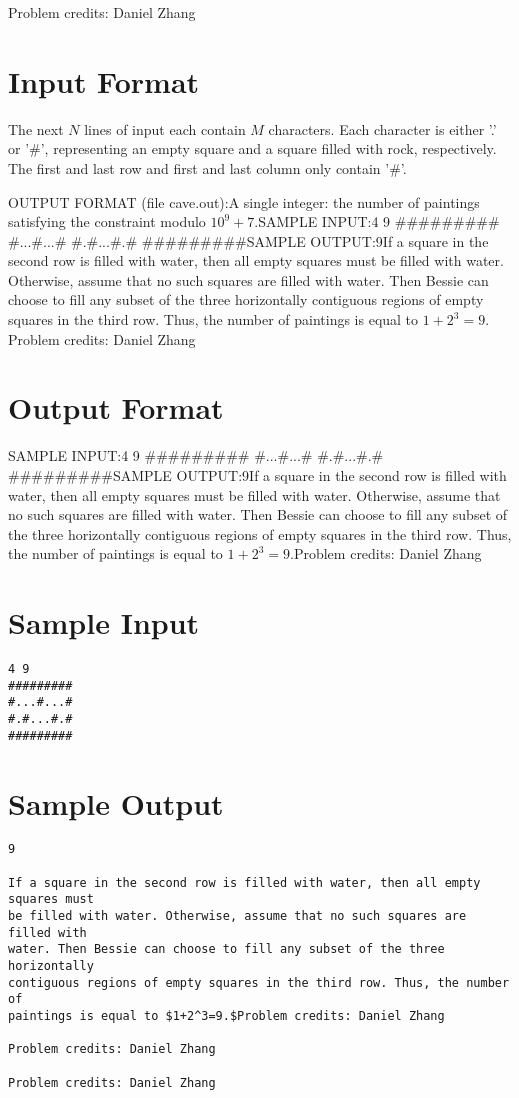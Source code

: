 \documentclass[12pt]{article}
\begin{document}
Problem credits: Daniel Zhang



\section*{Input Format}
The next $N$ lines of input each contain $M$ characters. Each character is
either '.' or '#', representing an empty square and a square filled with rock,
respectively. The first and last row and first and last column only contain '#'.

OUTPUT FORMAT (file cave.out):A single integer: the number of paintings satisfying the constraint modulo
$10^9+7$.SAMPLE INPUT:4 9
#########
#...#...#
#.#...#.#
#########SAMPLE OUTPUT:9If a square in the second row is filled with water, then all empty squares must
be filled with water. Otherwise, assume that no such squares are filled with
water. Then Bessie can choose to fill any subset of the three horizontally
contiguous regions of empty squares in the third row. Thus, the number of
paintings is equal to $1+2^3=9.$Problem credits: Daniel Zhang

\section*{Output Format}
SAMPLE INPUT:4 9
#########
#...#...#
#.#...#.#
#########SAMPLE OUTPUT:9If a square in the second row is filled with water, then all empty squares must
be filled with water. Otherwise, assume that no such squares are filled with
water. Then Bessie can choose to fill any subset of the three horizontally
contiguous regions of empty squares in the third row. Thus, the number of
paintings is equal to $1+2^3=9.$Problem credits: Daniel Zhang

\section*{Sample Input}
\begin{verbatim}
4 9
#########
#...#...#
#.#...#.#
#########
\end{verbatim}

\section*{Sample Output}
\begin{verbatim}
9

If a square in the second row is filled with water, then all empty squares must
be filled with water. Otherwise, assume that no such squares are filled with
water. Then Bessie can choose to fill any subset of the three horizontally
contiguous regions of empty squares in the third row. Thus, the number of
paintings is equal to $1+2^3=9.$Problem credits: Daniel Zhang

Problem credits: Daniel Zhang

Problem credits: Daniel Zhang
\end{verbatim}
\end{document}
